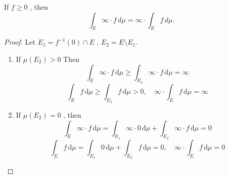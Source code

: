 \documentclass[../main.tex]{subfiles}
\begin{document}
\begin{problem}{}{}
If $f \ge 0$ , then 
\[
\int_E \infty\cdot f \, d\mu = \infty\cdot  \int_E f \, d\mu.
\]
\end{problem}
\begin{proof}
    Let \(  E_1=  f^{-1} \left( 0 \right)\cap E   \) , \(  E_2=  E\setminus E_1  \).   
    \begin{enumerate}
        \item If  \(  \mu \left( E_2 \right)> 0   \) Then \[
        \int_{E} \infty\cdot f\,\mathrm{d} \mu \ge  \int_{E_2}\infty\cdot f\,\mathrm{d} \mu = \infty
        \]   \[
        \int_{E}f\,\mathrm{d} \mu \ge \int_{E_2}f\,\mathrm{d} \mu > 0,\quad  \infty\cdot \int_{E}f\,\mathrm{d} \mu = \infty
        \]
        \item If \(  \mu \left( E_2 \right)= 0  \) , then \[
        \int_{E}\infty\cdot f\,\mathrm{d} \mu =  \int_{E_1}\infty\cdot 0\,\mathrm{d} \mu + \int_{E_2}\infty\cdot f\,\mathrm{d} \mu = 0
        \]  \[
        \int_{E}f\,\mathrm{d} \mu =  \int_{E_1}0\,\mathrm{d} \mu + \int_{E_2}f\,\mathrm{d} \mu = 0,\quad \infty\cdot \int_{E}f\,\mathrm{d} \mu = 0
        \]
    \end{enumerate}
      
\end{proof}
\end{document}
